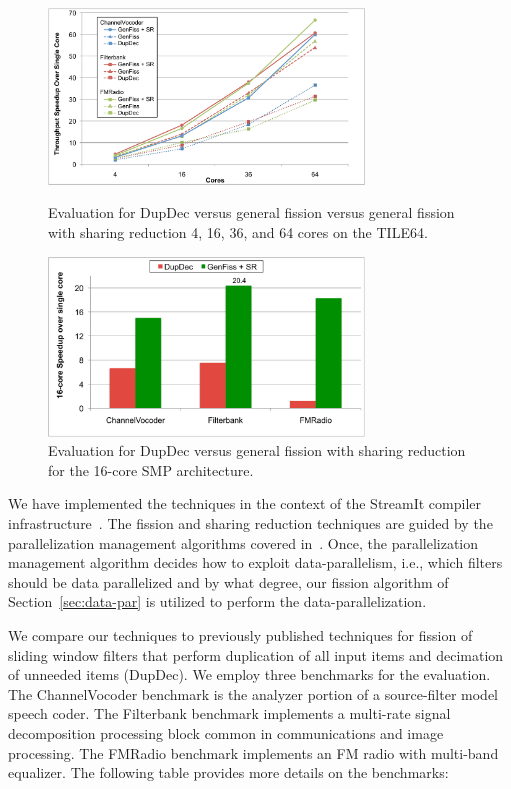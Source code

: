 \begin{figure}[t]
\begin{minipage}[b]{0.5\linewidth}
\centering
\includegraphics[width=3.3in]{figures/tilera-chart.pdf}
\caption{ Evaluation for DupDec versus general fission versus general fission with sharing reduction
  4, 16, 36, and 64 cores on the TILE64.}
\label{fig:tilera-chart}
\end{minipage}
\hspace{0.5cm}
\begin{minipage}[b]{0.5\linewidth}
\centering
\includegraphics[width=3.3in]{figures/smp-chart.pdf}
\caption{Evaluation for DupDec versus general fission with sharing reduction
  for the 16-core SMP architecture. }
\label{fig:smp-chart}
\end{minipage}
\end{figure}

We have implemented the techniques in the context of the StreamIt
compiler infrastructure~\cite{gordon-asplos06}.  The fission and
sharing reduction techniques are guided by the parallelization
management algorithms covered in~\cite{gordon-asplos06}.  Once, the
parallelization management algorithm decides how to exploit
data-parallelism, i.e., which filters should be data parallelized and
by what degree, our fission algorithm of Section~\ref{sec:data-par} is
utilized to perform the data-parallelization.

We compare our techniques to previously published techniques for
fission of sliding window filters that perform duplication of all
input items and decimation of unneeded items (DupDec).  We employ
three benchmarks for the evaluation.  The ChannelVocoder benchmark is
the analyzer portion of a source-filter model speech coder.  The
Filterbank benchmark implements a multi-rate signal decomposition
processing block common in communications and image processing.  The
FMRadio benchmark implements an FM radio with multi-band equalizer.
The following table provides more details on the benchmarks:


